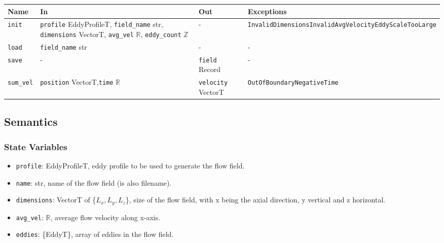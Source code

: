 \documentclass[12pt, titlepage]{article}
\begin{document}
\begin{center}
\begin{tabular}{p{2cm} p{4.5cm} p{3.5cm} p{4cm}}
\hline
\textbf{Name} & \textbf{In} & \textbf{Out} & \textbf{Exceptions} \\
\hline
\texttt{init} & \texttt{profile} EddyProfileT, \newline\texttt{field\_name} str, \newline\texttt{dimensions} VectorT, \newline\texttt{avg\_vel} $\mathbb{R}$, \newline\texttt{eddy\_count} $\mathbb{Z}$ & - & \texttt{InvalidDimensions}\newline\texttt{InvalidAvgVelocity}\newline\texttt{EddyScaleTooLarge}\\
\texttt{load} & \texttt{field\_name} str & - & -  \\
\texttt{save} & - & \texttt{field} Record & -  \\
\texttt{sum\_vel}& \texttt{position} VectorT,\newline\texttt{time} $\mathbb{R}$ & \texttt{velocity} VectorT & \texttt{OutOfBoundary}\newline\texttt{NegativeTime} \\
\hline
\end{tabular}
\end{center}

\subsection{Semantics}

\subsubsection{State Variables}
\begin{itemize}
  \item \texttt{profile}: EddyProfileT, eddy profile to be used to generate the flow field.
  \item \texttt{name}: str, name of the flow field (is also filename).
  \item \texttt{dimensions}: VectorT of \{$L_x, L_y, L_z$\}, size of the flow field, with x being the axial direction, y vertical and z horizontal.
  \item \texttt{avg\_vel}: $\mathbb{R}$, average flow velocity along x-axis.
  \item \texttt{eddies}: \{EddyT\}, array of eddies in the flow field.
\end{itemize}
\end{document}
